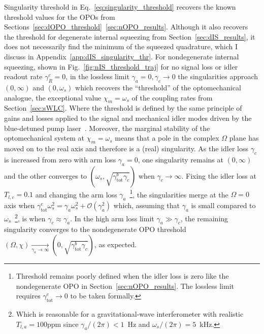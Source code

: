 Singularity threshold in Eq.~\ref{eq:singularity_threshold} recovers the known threshold values for the OPOs from Sections~\ref{sec:dOPO_threshold}~\ref{sec:nOPO_results}. Although it also recovers the threshold for degenerate internal squeezing from Section~\ref{sec:dIS_results}, it does not necessarily find the minimum of the squeezed quadrature, which I discuss in Appendix~\ref{app:dIS_singularity_thr}.
For nondegenerate internal squeezing, shown in Fig.~\ref{fig:nIS_threshold_traj} for no signal loss or idler readout rate $\gamma^c_R=0$, in the lossless limit $\gamma_a=0,\gamma_c\rightarrow0$ the singularities approach $(0,\infty)$ and $(0,\omega_s)$ which recovers the ``threshold'' of the optomechanical analogue, the exceptional value $\chi_m=\omega_s$ of the coupling rates from Section~\ref{sec:sWLC}. Where the threshold is defined by the same principle of gains and losses applied to the signal and mechanical idler modes driven by the blue-detuned pump laser~\cite{}. Moreover, the marginal stability of the optomechanical system at $\chi_m=\omega_s$ means that a pole in the complex $\Omega$ plane has moved on to the real axis and therefore is a (real) singularity. As the idler loss $\gamma_c$ is increased from zero with arm loss $\gamma_a=0$, one singularity remains at $(0,\infty)$ and the other converges to $(\omega_s,\sqrt{\gamma^b_\text{tot}\gamma_c})$ when $\gamma_c\rightarrow\infty$. Fixing the idler loss at $T_{l,c}=0.1$ and changing the arm loss $\gamma_a$~\footnote{Threshold remains poorly defined when the idler loss is zero  like the nondegenerate OPO in Section~\ref{sec:nOPO_results}. The lossless limit requires $\gamma^c_\text{tot}\rightarrow0$ to be taken formally.}, the singularities merge  at the $\Omega=0$ axis when $\gamma^c_\text{tot}\omega_s^2=\gamma_a\omega_s^2+\mathcal{O}(\gamma_a^2)$ which, assuming that $\gamma_a$ is small compared to $\omega_s$~\footnote{Which is reasonable for a gravitational-wave interferometer with realistic $T_{l,a}=100\text{ppm}$ since $\gamma_a/(2\pi)<1$~Hz and $\omega_s/(2\pi)=5$~kHz.}, is when $\gamma_c\approx\gamma_a$. In the high arm loss limit $\gamma_a\gg\gamma_c$, the remaining singularity converges to the nondegenerate OPO threshold $(\Omega,\chi)\xrightarrow[\gamma_a\rightarrow\infty]{}(0,\sqrt{\gamma^b_\mathrm{tot}\gamma_c})$, as expected.

